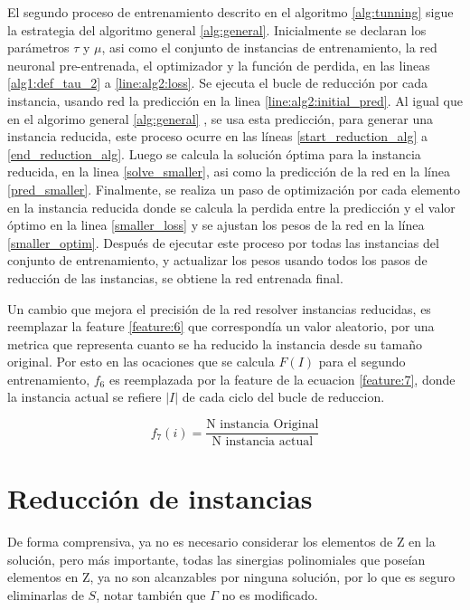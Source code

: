 \documentclass[spanish, a4paper, 12pt, openany,final]{book}
\begin{document}
El segundo proceso de entrenamiento descrito en el algoritmo \ref{alg:tunning} sigue la estrategia del algoritmo general \ref{alg:general}. Inicialmente se declaran los parámetros $\tau$ y $\mu$, asi como el conjunto de instancias de entrenamiento, la red neuronal pre-entrenada, el optimizador y la función de perdida, en las lineas \ref{alg1:def_tau_2} a \ref{line:alg2:loss}. Se ejecuta el bucle de reducción por cada instancia, usando red la predicción en la linea \ref{line:alg2:initial_pred}. Al igual que en el algorimo general \ref{alg:general} , se usa esta predicción, para generar una instancia reducida, este proceso ocurre en las líneas \ref{start_reduction_alg} a \ref{end_reduction_alg}. Luego se calcula la solución óptima para la instancia reducida, en la linea \ref{solve_smaller}, asi como la predicción de la red en la línea \ref{pred_smaller}. Finalmente, se realiza un paso de optimización por cada elemento en la instancia reducida donde se calcula la perdida entre la predicción y el valor óptimo en la linea \ref{smaller_loss} y se ajustan los pesos de la red en la línea \ref{smaller_optim}.
Después de ejecutar este proceso por todas las instancias del conjunto de entrenamiento, y actualizar los pesos usando todos los pasos de reducción de las instancias, se obtiene la red entrenada final.

Un cambio que mejora el precisión de la red resolver instancias reducidas, es reemplazar la feature \ref{feature:6} que correspondía un valor aleatorio, por una metrica que representa cuanto se ha reducido la instancia desde su tamaño original. Por esto en las ocaciones que se calcula $F(I)$ para el segundo entrenamiento, $f_6$ es reemplazada por la feature de la ecuacion \ref{feature:7}, donde la instancia actual se refiere $|I|$ de cada ciclo del bucle de reduccion.

\begin{equation}
	\label{feature:7}
	f_7(i) = \frac{\text{N instancia Original}}{\text{N instancia actual}}
\end{equation}




 \section{Reducción de instancias}
 
 De forma comprensiva, ya no es necesario considerar los elementos de Z en la solución, pero más importante,
 todas las sinergias polinomiales que poseían elementos en Z, ya no son alcanzables por ninguna solución, por lo que es seguro eliminarlas de $S$, notar también que $\Gamma$ no es modificado.
 
\end{document}

